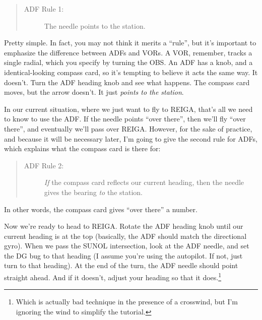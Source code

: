 \begin{quote}
  \begin{description}
  \item[ADF Rule 1:] The needle points to the station.
  \end{description}
\end{quote}

Pretty simple.  In fact, you may not think it merits a ``rule'', but
it's important to emphasize the difference between ADFs and VORs.  A
VOR, remember, tracks a single radial, which you specify by turning
the OBS.  An ADF has a knob, and a identical-looking compass card, so
it's tempting to believe it acts the same way.  It doesn't.  Turn the
ADF heading knob and see what happens.  The compass card moves, but
the arrow doesn't.  It just \emph{points to the station}.

In our current situation, where we just want to fly to REIGA, that's
all we need to know to use the ADF.  If the needle points ``over
there'', then we'll fly ``over there'', and eventually we'll pass over
REIGA.  However, for the sake of practice, and because it will be
necessary later, I'm going to give the second rule for ADFs, which
explains what the compass card is there for:

\begin{quote}
  \begin{description}
  \item[ADF Rule 2:] \emph{If} the compass card reflects our current
    heading, then the needle gives the bearing \emph{to} the station.
  \end{description}
\end{quote}

In other words, the compass card gives ``over there'' a number.


Now we're ready to head to REIGA.  Rotate the ADF heading knob until
our current heading is at the top (basically, the ADF should match the
directional gyro).  When we pass the SUNOL intersection, look at the
ADF needle, and set the DG bug to that heading (I assume you're using
the autopilot.  If not, just turn to that heading).  At the end of the
turn, the ADF needle should point straight ahead.  And if it doesn't,
adjust your heading so that it does.\footnote{Which is actually bad
  technique in the presence of a crosswind, but I'm ignoring the wind
  to simplify the tutorial.}


